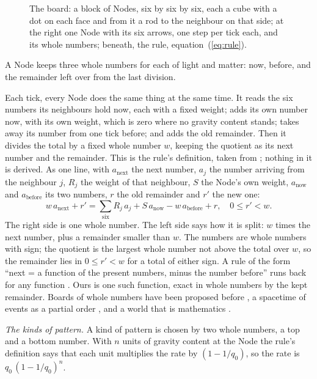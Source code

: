 \documentclass[pdflatex,sn-mathphys-num]{sn-jnl}
\begin{document}
\begin{figure}[!t]\centering
\FigureBoard
\caption{\label{fig:board}The board: a block of Nodes, six by six by six, each a cube with a dot on each face and from it a rod to the neighbour on that side; at the right one Node with its six arrows, one step per tick each, and its whole numbers; beneath, the rule, equation~(\ref{eq:rule}).}
\end{figure}

A Node keeps three whole numbers for each of light and matter: now, before, and the remainder left over from the last division.

Each tick, every Node does the same thing at the same time. It reads the six numbers its neighbours hold now, each with a fixed weight; adds its own number now, with its own weight, which is zero where no gravity content stands; takes away its number from one tick before; and adds the old remainder. Then it divides the total by a fixed whole number $w$, keeping the quotient as its next number and the remainder. This is the rule's definition, taken from \cite{first}; nothing in it is derived. As one line, with $a_{\mathrm{next}}$ the next number, $a_j$ the number arriving from the neighbour $j$, $R_j$ the weight of that neighbour, $S$ the Node's own weight, $a_{\mathrm{now}}$ and $a_{\mathrm{before}}$ its two numbers, $r$ the old remainder and $r'$ the new one:
\begin{equation}\label{eq:rule}
\boxed{\,w\,a_{\mathrm{next}} + r' = \sum_{\text{six}} R_j\,a_j + S\,a_{\mathrm{now}} - w\,a_{\mathrm{before}} + r, \quad 0 \le r' < w.\,}
\end{equation}
The right side is one whole number. The left side says how it is split: $w$ times the next number, plus a remainder smaller than $w$. The numbers are whole numbers with sign; the quotient is the largest whole number not above the total over $w$, so the remainder lies in $0 \le r' < w$ for a total of either sign. A rule of the form ``next = a function of the present numbers, minus the number before'' runs back for any function \cite{toffoli1990,fredkin1990}. Ours is one such function, exact in whole numbers by the kept remainder. Boards of whole numbers have been proposed before \cite{zuse1969,wolfram2002,thooft2016}, a spacetime of events as a partial order \cite{bombelli1987}, and a world that is mathematics \cite{tegmark2008}.

\textit{The kinds of pattern.} A kind of pattern is chosen by two whole numbers, a top and a bottom number. With $n$ units of gravity content at the Node the rule's definition says that each unit multiplies the rate by $(1 - 1/q_0)$, so the rate is $q_0\,(1 - 1/q_0)^n$.
\end{document}
